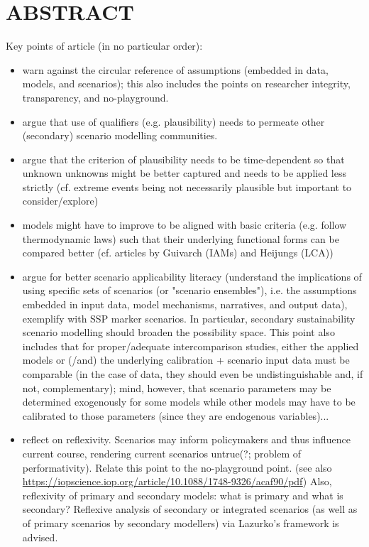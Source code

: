 \documentclass{article}
\begin{document}

\frontmatter
\tableofcontents

\mainmatter
\linenumbers

{\huge{\multiTitle}}

\section*{ABSTRACT}
Key points of article (in no particular order):

\begin{itemize}
    \item warn against the circular reference of assumptions (embedded in data, models, and scenarios); this also includes the points on researcher integrity, transparency, and no-playground.
    \item argue that use of qualifiers (e.g. plausibility) needs to permeate other (secondary) scenario modelling communities.
    \item argue that the criterion of plausibility needs to be time-dependent so that unknown unknowns might be better captured and needs to be applied less strictly (cf. extreme events being not necessarily plausible but important to consider/explore)
    \item models might have to improve to be aligned with basic criteria (e.g. follow thermodynamic laws) such that their underlying functional forms can be compared better (cf. articles by Guivarch (IAMs) and Heijungs (LCA))
    \item argue for better scenario applicability literacy (understand the implications of using specific sets of scenarios (or "scenario ensembles"), i.e. the assumptions embedded in input data, model mechanisms, narratives, and output data), exemplify with SSP marker scenarios. In particular, secondary sustainability scenario modelling should broaden the possibility space. This point also includes that for proper/adequate intercomparison studies, either the applied models or (/and) the underlying calibration + scenario input data must be comparable (in the case of data, they should even be undistinguishable and, if not, complementary); mind, however, that scenario parameters may be determined exogenously for some models while other models may have to be calibrated to those parameters (since they are endogenous variables)...
    \item reflect on reflexivity. Scenarios may inform policymakers and thus influence current course, rendering current scenarios untrue(?; problem of performativity). Relate this point to the no-playground point. (see also \url{https://iopscience.iop.org/article/10.1088/1748-9326/acaf90/pdf}) Also, reflexivity of primary and secondary models: what is primary and what is secondary? Reflexive analysis of secondary or integrated scenarios (as well as of primary scenarios by secondary modellers) via Lazurko's framework is advised.
\end{itemize}
\end{document}
